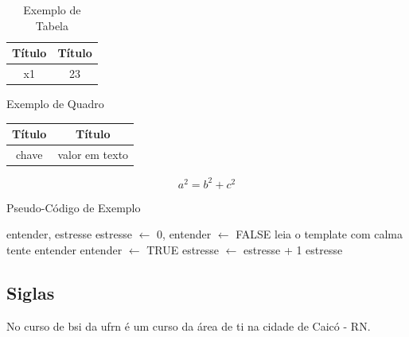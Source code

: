     \begin{table}[h]
        \centering
        \caption{Exemplo de Tabela}
        \begin{tabular}{c|c}
            \hline
            \textbf{Título} & \textbf{Título}  \\ \hline %
            x1 & 23 \\ \hline 
        \end{tabular}
        \label{tab:tabela}
    \end{table}

    
    \begin{quadro}[h]
        \centering
        \caption{Exemplo de Quadro}
        \begin{tabular}{|c|c|}
            \hline
            \textbf{Título} & \textbf{Título}  \\ \hline
            chave & valor em texto \\ \hline
        \end{tabular}
        \label{tab:quadro}
    \end{quadro}
    
    \begin{equation}
        \label{eq:equacao}
        a^2 = b^2 + c^2
    \end{equation}
    
    \begin{algorithm}[H]
        \caption{Pseudo\hyp{Código} de Exemplo}
        \label{alg:algoritmo}
        \SetAlgoLined
        \begin{algorithmic}[1]
            \REQUIRE entender, estresse
            \ENSURE estresse $\leftarrow$ 0, entender $\leftarrow$ FALSE
            \REPEAT
            	\STATE leia o template com calma
            	\STATE tente entender
                    \STATE entender $\leftarrow$ TRUE
                \ELSE
                    \STATE estresse $\leftarrow$ estresse + 1
                \ENDIF
            \RETURN estresse
        \end{algorithmic}
    \end{algorithm}
    \begin{center}
        \vspace{-2em}
    \end{center}
    
    \subsection{\textbf{Siglas}}
        \label{sec:siglas}
        
        No curso de \ac{bsi} da \ac{ufrn} é um curso da área de \ac{ti} na cidade de Caicó - RN.
\newpage
